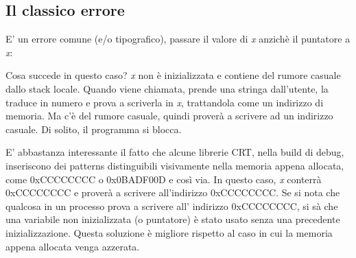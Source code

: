 \subsection{Il classico errore}

E' un errore comune (e/o tipografico), passare il valore di \emph{x} anzichè il puntatore a \emph{x}:



Cosa succede in questo caso?
\emph{x} non è inizializzata e contiene del rumore casuale dallo stack locale.
Quando \scanf viene chiamata, prende una stringa dall'utente, la traduce in numero e prova a scriverla in \emph{x}, trattandola come un indirizzo di memoria.
Ma c'è del rumore casuale, quindi \scanf proverà a scrivere ad un indirizzo casuale.
Di solito, il programma si blocca.

E' abbastanza interessante il fatto che alcune librerie \ac{CRT}, nella build di debug, inseriscono dei patterns distinguibili visivamente nella memoria appena allocata, come 0xCCCCCCCC o 0x0BADF00D e così via.
In questo caso, \emph{x} conterrà 0xCCCCCCCC e \scanf proverà a scrivere all'indirizzo 0xCCCCCCCC.
Se si nota che qualcosa in un processo prova a scrivere all' indirizzo 0xCCCCCCCC, si sà che una variabile non inizializzata (o puntatore) è stato usato senza una precedente inizializzazione.
Questa soluzione è migliore rispetto al caso in cui la memoria appena allocata venga azzerata.
